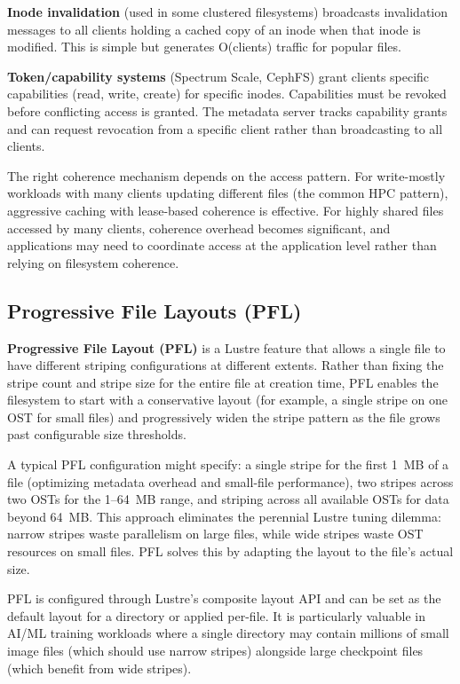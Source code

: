\textbf{Inode invalidation} (used in some clustered filesystems) broadcasts invalidation messages to all clients holding a cached copy of an inode when that inode is modified. This is simple but generates O(clients) traffic for popular files.

\textbf{Token/capability systems} (Spectrum Scale, CephFS) grant clients specific capabilities (read, write, create) for specific inodes. Capabilities must be revoked before conflicting access is granted. The metadata server tracks capability grants and can request revocation from a specific client rather than broadcasting to all clients.

The right coherence mechanism depends on the access pattern. For write-mostly workloads with many clients updating different files (the common HPC pattern), aggressive caching with lease-based coherence is effective. For highly shared files accessed by many clients, coherence overhead becomes significant, and applications may need to coordinate access at the application level rather than relying on filesystem coherence.


\subsection{Progressive File Layouts (PFL)}

\textbf{Progressive File Layout (PFL)} is a Lustre feature that allows a single file to have different striping configurations at different extents. Rather than fixing the stripe count and stripe size for the entire file at creation time, PFL enables the filesystem to start with a conservative layout (for example, a single stripe on one OST for small files) and progressively widen the stripe pattern as the file grows past configurable size thresholds.

A typical PFL configuration might specify: a single stripe for the first 1~MB of a file (optimizing metadata overhead and small-file performance), two stripes across two OSTs for the 1--64~MB range, and striping across all available OSTs for data beyond 64~MB. This approach eliminates the perennial Lustre tuning dilemma: narrow stripes waste parallelism on large files, while wide stripes waste OST resources on small files. PFL solves this by adapting the layout to the file's actual size.

PFL is configured through Lustre's composite layout API and can be set as the default layout for a directory or applied per-file. It is particularly valuable in AI/ML training workloads where a single directory may contain millions of small image files (which should use narrow stripes) alongside large checkpoint files (which benefit from wide stripes).

